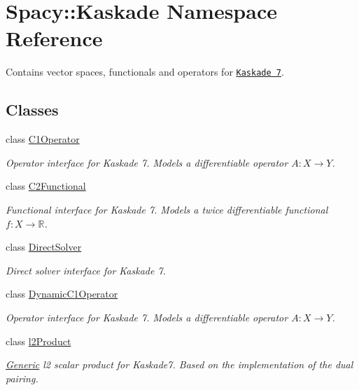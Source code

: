\hypertarget{namespaceSpacy_1_1Kaskade}{}\section{Spacy\+:\+:Kaskade Namespace Reference}
\label{namespaceSpacy_1_1Kaskade}


Contains vector spaces, functionals and operators for \href{http://www.zib.de/projects/kaskade7-finite-element-toolbox}{\tt Kaskade 7}.  


\subsection*{Classes}
\begin{DoxyCompactItemize}
\item 
class \hyperlink{classSpacy_1_1Kaskade_1_1C1Operator}{C1\+Operator}
\begin{DoxyCompactList}\small\item\em Operator interface for Kaskade 7. Models a differentiable operator $A:X\rightarrow Y$. \end{DoxyCompactList}\item 
class \hyperlink{classSpacy_1_1Kaskade_1_1C2Functional}{C2\+Functional}
\begin{DoxyCompactList}\small\item\em Functional interface for Kaskade 7. Models a twice differentiable functional $f:X\rightarrow \mathbb{R}$. \end{DoxyCompactList}\item 
class \hyperlink{classSpacy_1_1Kaskade_1_1DirectSolver}{Direct\+Solver}
\begin{DoxyCompactList}\small\item\em Direct solver interface for Kaskade 7. \end{DoxyCompactList}\item 
class \hyperlink{classSpacy_1_1Kaskade_1_1DynamicC1Operator}{Dynamic\+C1\+Operator}
\begin{DoxyCompactList}\small\item\em Operator interface for Kaskade 7. Models a differentiable operator $A:X\rightarrow Y$. \end{DoxyCompactList}\item 
class \hyperlink{classSpacy_1_1Kaskade_1_1l2Product}{l2\+Product}
\begin{DoxyCompactList}\small\item\em \hyperlink{namespaceSpacy_1_1Generic}{Generic} l2 scalar product for Kaskade7. Based on the implementation of the dual pairing. \end{DoxyCompactList}\item 

\end{DoxyCompactItemize}

